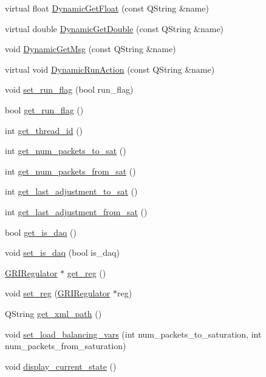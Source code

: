 \begin{DoxyCompactItemize}
\item 
virtual float \hyperlink{classGRIProcessThread_a2b2988ab4d60a3ac45709f0de6511aa4}{\-Dynamic\-Get\-Float} (const \-Q\-String \&name)
\item 
virtual double \hyperlink{classGRIProcessThread_a412ed5491cad50ab24bf484e8c7e6591}{\-Dynamic\-Get\-Double} (const \-Q\-String \&name)
\item 
void \hyperlink{classGRIProcessThread_a45c0f78282d4984efd70ed963b45eda8}{\-Dynamic\-Get\-Msg} (const \-Q\-String \&name)
\item 
virtual void \hyperlink{classGRIProcessThread_a97fde27005f2d5b4ef2ddd85245fcd27}{\-Dynamic\-Run\-Action} (const \-Q\-String \&name)
\item 
void \hyperlink{classGRIProcessThread_aa1c2c19f16e8a8e8b827b8db8623e1f4}{set\-\_\-run\-\_\-flag} (bool run\-\_\-flag)
\item 
bool \hyperlink{classGRIProcessThread_ad1b8c5977b21765c457cc9cca782f6b1}{get\-\_\-run\-\_\-flag} ()
\item 
int \hyperlink{classGRIProcessThread_a3ffef0a545f36cce75a0931ae6461455}{get\-\_\-thread\-\_\-id} ()
\item 
int \hyperlink{classGRIProcessThread_ad657c54d048fd87e8b907b1e45b10225}{get\-\_\-num\-\_\-packets\-\_\-to\-\_\-sat} ()
\item 
int \hyperlink{classGRIProcessThread_ab2e5c1ec3649c33eebbcbdfc71cef717}{get\-\_\-num\-\_\-packets\-\_\-from\-\_\-sat} ()
\item 
int \hyperlink{classGRIProcessThread_a841a80a2f4ed038eda84cdfb7bbc84ee}{get\-\_\-last\-\_\-adjustment\-\_\-to\-\_\-sat} ()
\item 
int \hyperlink{classGRIProcessThread_a57c3a67058b9bef780ee06c27dff7106}{get\-\_\-last\-\_\-adjustment\-\_\-from\-\_\-sat} ()
\item 
bool \hyperlink{classGRIProcessThread_a92fd125cdea966be6174dd9c36ac34c3}{get\-\_\-is\-\_\-daq} ()
\item 
void \hyperlink{classGRIProcessThread_a857d9628e01e6ecb4ddd311422173607}{set\-\_\-is\-\_\-daq} (bool is\-\_\-daq)
\item 
\hyperlink{classGRIRegulator}{\-G\-R\-I\-Regulator} $\ast$ \hyperlink{classGRIProcessThread_ac09d5b43b3e23dbcff28ed4978282ab8}{get\-\_\-reg} ()
\item 
void \hyperlink{classGRIProcessThread_acb3b59b5ed83b8b044e519d9294ce8ef}{set\-\_\-reg} (\hyperlink{classGRIRegulator}{\-G\-R\-I\-Regulator} $\ast$reg)
\item 
\-Q\-String \hyperlink{classGRIProcessThread_ae784da2cb525e593e3ff3b91d20fcb99}{get\-\_\-xml\-\_\-path} ()
\item 
void \hyperlink{classGRIProcessThread_a8dc5e101ac14539d38f291f6031f9ef1}{set\-\_\-load\-\_\-balancing\-\_\-vars} (int num\-\_\-packets\-\_\-to\-\_\-saturation, int num\-\_\-packets\-\_\-from\-\_\-saturation)
\item 
void \hyperlink{classGRIProcessThread_a25eddada2448f25431c9e1214976edfe}{display\-\_\-current\-\_\-state} ()
\end{DoxyCompactItemize}
